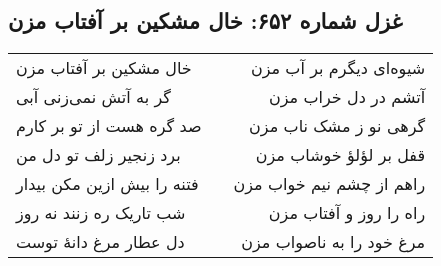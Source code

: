 \begin{center}
\section*{غزل شماره ۶۵۲: خال مشکین بر آفتاب مزن}
\label{sec:652}
\begin{longtable}{l p{0.5cm} r}
خال مشکین بر آفتاب مزن
&&
شیوه‌ای دیگرم بر آب مزن
\\
گر به آتش نمی‌زنی آبی
&&
آتشم در دل خراب مزن
\\
صد گره هست از تو بر کارم
&&
گرهی نو ز مشک ناب مزن
\\
برد زنجیر زلف تو دل من
&&
قفل بر لؤلؤ خوشاب مزن
\\
فتنه را بیش ازین مکن بیدار
&&
راهم از چشم نیم خواب مزن
\\
شب تاریک ره زنند نه روز
&&
راه را روز و آفتاب مزن
\\
دل عطار مرغ دانهٔ توست
&&
مرغ خود را به ناصواب مزن
\\
\end{longtable}
\end{center}
